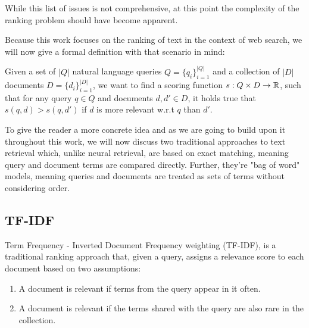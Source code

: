 While this list of issues is not comprehensive, at this point the complexity of the ranking problem should have become apparent.

Because this work focuses on the ranking of text in the context of web search, we will now give a formal definition with that scenario in mind:

Given a set of $|Q|$ natural language queries $Q = \{q_i\}_{i=1}^{|Q|}$ and a collection of $|D|$ documents $D = \{d_i\}_{i=1}^{|D|}$, we want to find a scoring function $s: Q \times D \rightarrow \mathbb{R}$, such that for any query $q \in Q$ and documents $d, d' \in D$, it holds true that $s(q, d) > s(q, d')$ if $d$ is more relevant w.r.t $q$ than $d'$.

To give the reader a more concrete idea and as we are going to build upon it throughout this work, we will now discuss two traditional approaches to text retrieval which, unlike neural retrieval, are based on exact matching, meaning query and document terms are compared directly. Further, they're "bag of word" models, meaning queries and documents are treated as sets of terms without considering order.

\subsection{TF-IDF}
Term Frequency - Inverted Document Frequency weighting (TF-IDF), is a traditional ranking approach that, given a query, assigns a relevance score to each document based on two assumptions:
\begin{enumerate}
    \item A document is relevant if terms from the query appear in it often.
    \item A document is relevant if the terms shared with the query are also rare in the collection.
\end{enumerate}

